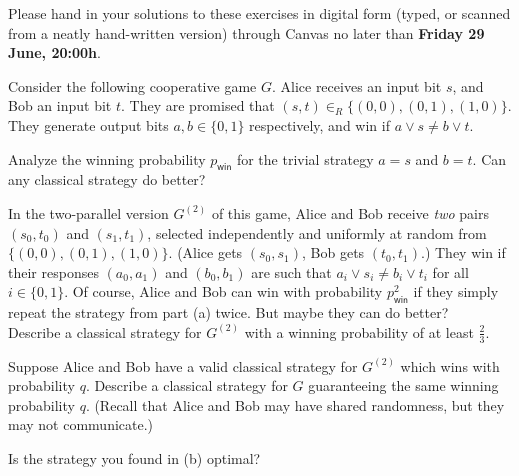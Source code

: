 \documentclass[a4paper,10pt,landscape,twocolumn]{scrartcl}
\newcommand\deadline{Friday 29 June, 20:00h}
\begin{document}
\newcommand{\Hmin}{\mathrm{H}_{\mathrm{min}}}

\homeworkproblems

{\sffamily\noindent
Please hand in your solutions to these exercises in digital form (typed, or scanned from a neatly hand-written version) through Canvas no later than \textbf{\deadline}.  %
}

\begin{exercise}
	Consider the following cooperative game $G$. Alice receives an input bit $s$, and Bob an input bit $t$. They are promised that $(s,t) \in_R \{(0,0),(0,1),(1,0)\}$. They generate output bits $a,b \in \{0,1\}$ respectively, and win if $a \vee s \neq b \vee t$.
	\begin{subex}
		Analyze the winning probability $p_{\mathsf{win}}$ for the trivial strategy $a = s$ and $b = t$. Can any classical strategy do better?
	\end{subex}
    \begin{subex}
    	In the two-parallel version $G^{(2)}$ of this game, Alice and Bob receive \emph{two} pairs $(s_0, t_0)$ and $(s_1, t_1)$, selected independently and uniformly at random from $\{(0,0),(0,1),(1,0)\}$. (Alice gets $(s_0, s_1)$, Bob gets $(t_0, t_1)$.) They win if their responses $(a_0, a_1)$ and $(b_0, b_1)$ are such that $a_i \vee s_i \neq b_i \vee t_i$ for all $i \in \{0,1\}$. Of course, Alice and Bob can win with probability $p_{\mathsf{win}}^2$ if they simply repeat the strategy from part (a) twice. But maybe they can do better?
    	\\
    	Describe a classical strategy for $G^{(2)}$ with a winning probability of at least $\frac{2}{3}$.
    \end{subex}
    \begin{subex}
    	Suppose Alice and Bob have a valid classical strategy for $G^{(2)}$ which wins with probability $q$. Describe a classical strategy for $G$ guaranteeing the same winning probability $q$. (Recall that Alice and Bob may have shared randomness, but they may not communicate.)
    \end{subex}
    \begin{subex}
    Is the strategy you found in (b) optimal?
    \end{subex}
\end{exercise}
\end{document}
